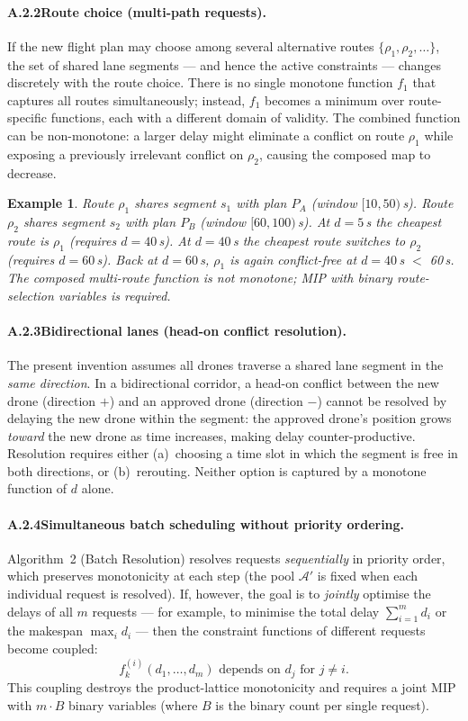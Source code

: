 \documentclass[12pt,a4paper]{article}
\newtheorem{example}{Example}
\begin{document}
\paragraph{A.2.2\quad Route choice (multi-path requests).}
If the new flight plan may choose among several alternative routes
$\{\rho_1, \rho_2, \ldots\}$, the set of shared lane segments —
and hence the active constraints — changes discretely with the route
choice.  There is no single monotone function $f_1$ that captures all
routes simultaneously; instead, $f_1$ becomes a minimum over route-
specific functions, each with a different domain of validity.  The
combined function can be non-monotone: a larger delay might eliminate a
conflict on route $\rho_1$ while exposing a previously irrelevant
conflict on $\rho_2$, causing the composed map to decrease.

\begin{example}
Route $\rho_1$ shares segment $s_1$ with plan $P_A$ (window $[10, 50)$\,s).
Route $\rho_2$ shares segment $s_2$ with plan $P_B$ (window $[60, 100)$\,s).
At $d = 5$\,s the cheapest route is $\rho_1$ (requires $d = 40$\,s).
At $d = 40$\,s the cheapest route switches to $\rho_2$ (requires
$d = 60$\,s).  Back at $d = 60$\,s, $\rho_1$ is again conflict-free
at $d = 40$\,s $<$ 60\,s.
The composed multi-route function is not monotone; MIP with binary
route-selection variables is required.
\end{example}

\paragraph{A.2.3\quad Bidirectional lanes (head-on conflict resolution).}
The present invention assumes all drones traverse a shared lane segment
in the \emph{same direction}.  In a bidirectional corridor, a head-on
conflict between the new drone (direction $+$) and an approved drone
(direction $-$) cannot be resolved by delaying the new drone within the
segment: the approved drone's position grows \emph{toward} the new
drone as time increases, making delay counter-productive.  Resolution
requires either (a)~choosing a time slot in which the segment is free
in both directions, or (b)~rerouting.  Neither option is captured by a
monotone function of $d$ alone.

\paragraph{A.2.4\quad Simultaneous batch scheduling without priority ordering.}
Algorithm~2 (Batch Resolution) resolves requests \emph{sequentially} in
priority order, which preserves monotonicity at each step (the pool
$\mathcal{A}'$ is fixed when each individual request is resolved).
If, however, the goal is to \emph{jointly} optimise the delays of all
$m$ requests — for example, to minimise the total delay
$\sum_{i=1}^{m} d_i$ or the makespan $\max_i d_i$ — then the
constraint functions of different requests become coupled:
\[
  f_k^{(i)}(d_1, \ldots, d_m) \text{ depends on } d_j \text{ for } j \ne i.
\]
This coupling destroys the product-lattice monotonicity and requires a
joint MIP with $m \cdot B$ binary variables (where $B$ is the binary
count per single request).
\end{document}
